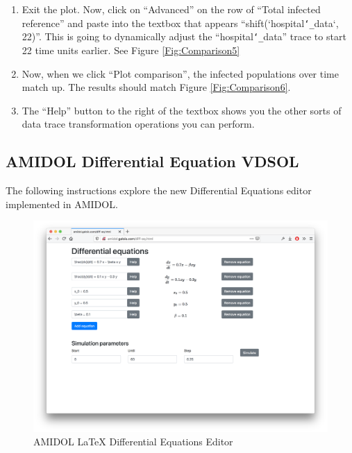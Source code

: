 \documentclass[12pt]{galois-whitepaper}
\renewcommand{\textunderscore}{\texttt{\char`_}}
\begin{document}
\begin{enumerate}
\item Exit the plot. Now, click on “Advanced” on the row of “Total
  infected reference” and paste into the textbox that appears
  “shift(`hospital\textunderscore{}data`, 22)”. This is going to dynamically adjust
  the “hospital\textunderscore{}data” trace to start 22 time units earlier.  See
  Figure \ref{Fig:Comparison5}
\item Now, when we click “Plot comparison”, the infected populations
  over time match up.  The results should match Figure \ref{Fig:Comparison6}.
\item The “Help” button to the right of the textbox shows you the other sorts of data trace transformation operations you can perform.
\end{enumerate}

\subsection{AMIDOL Differential Equation VDSOL}

The following instructions explore the new Differential Equations
editor implemented in AMIDOL.

\begin{figure}
  \centering
  \includegraphics[width=\textwidth]{figs/diff-eq-1.png}
  \caption{AMIDOL LaTeX Differential Equations Editor}
  \label{Fig:DiffEq1}
\end{figure}
\end{document}
